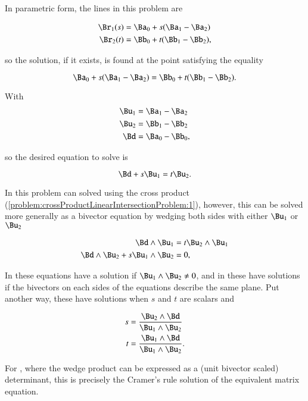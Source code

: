 
In parametric form, the lines in this problem are

\begin{dmath}\label{eqn:SimpleProducts2:1000}
\begin{aligned}
\Br_1(s) &= \Ba_0 + s( \Ba_1 - \Ba_2 ) \\
\Br_2(t) &= \Bb_0 + t( \Bb_1 - \Bb_2 ),
\end{aligned}
\end{dmath}

so the solution, if it exists, is found at the point satisfying the equality

\begin{dmath}\label{eqn:SimpleProducts2:1020}
\Ba_0 + s( \Ba_1 - \Ba_2 ) = \Bb_0 + t( \Bb_1 - \Bb_2 ).
\end{dmath}

With
\begin{dmath}\label{eqn:SimpleProducts2:1040}
\begin{aligned}
\Bu_1 &= \Ba_1 - \Ba_2 \\
\Bu_2 &= \Bb_1 - \Bb_2 \\
\Bd &= \Ba_0 - \Bb_0,
\end{aligned}
\end{dmath}

so the desired equation to solve is

\begin{dmath}\label{eqn:SimpleProducts2:1060}
\Bd + s \Bu_1 = t \Bu_2.
\end{dmath}

In  this problem can solved using the cross product (\cref{problem:crossProductLinearIntersectionProblem:1}), however, this can be solved more generally as a
bivector equation by wedging both sides with either \( \Bu_1 \) or \( \Bu_2 \)

\begin{dmath}\label{eqn:SimpleProducts2:1080}
\begin{aligned}
\Bd \wedge \Bu_1 &= t \Bu_2 \wedge \Bu_1 \\
\Bd \wedge \Bu_2 + s \Bu_1 \wedge \Bu_2 &= 0,
\end{aligned}
\end{dmath}

In  these equations have a solution if \( \Bu_1 \wedge \Bu_2 \ne 0 \), and in  these have solutions if the bivectors on each sides of the equations describe the same plane.
Put another way, these have solutions when \( s \) and \( t \) are scalars and

\begin{dmath}\label{eqn:SimpleProducts2:1100}
\begin{aligned}
s &= \frac{\Bu_2 \wedge \Bd}{\Bu_1 \wedge \Bu_2} \\
t &= \frac{\Bu_1 \wedge \Bd}{\Bu_1 \wedge \Bu_2}.
\end{aligned}
\end{dmath}

For ,
where the wedge product can be expressed as a (unit bivector scaled) determinant, this is precisely the Cramer's rule solution of the equivalent matrix equation.
